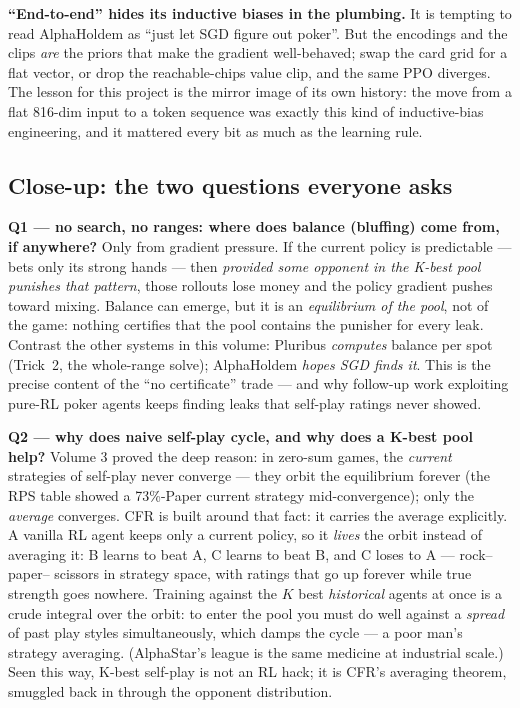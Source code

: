 \documentclass[11pt,a4paper]{article}
\begin{document}
\begin{trap}
\textbf{``End-to-end'' hides its inductive biases in the plumbing.} It is tempting
to read AlphaHoldem as ``just let SGD figure out poker''. But the encodings and
the clips \emph{are} the priors that make the gradient well-behaved; swap the card
grid for a flat vector, or drop the reachable-chips value clip, and the same PPO
diverges. The lesson for this project is the mirror image of its own history: the
move from a flat 816-dim input to a token sequence was exactly this kind of
inductive-bias engineering, and it mattered every bit as much as the learning
rule.
\end{trap}

\subsection{Close-up: the two questions everyone asks}

\textbf{Q1 --- no search, no ranges: where does balance (bluffing) come
from, if anywhere?} Only from gradient pressure. If the current policy is
predictable --- bets only its strong hands --- then \emph{provided some
opponent in the K-best pool punishes that pattern}, those rollouts lose
money and the policy gradient pushes toward mixing. Balance can emerge, but
it is an \emph{equilibrium of the pool}, not of the game: nothing certifies
that the pool contains the punisher for every leak. Contrast the other
systems in this volume: Pluribus \emph{computes} balance per spot (Trick~2,
the whole-range solve); AlphaHoldem \emph{hopes SGD finds it}. This is the
precise content of the ``no certificate'' trade --- and why follow-up work
exploiting pure-RL poker agents keeps finding leaks that self-play ratings
never showed.

\textbf{Q2 --- why does naive self-play cycle, and why does a K-best pool
help?} Volume 3 proved the deep reason: in zero-sum games, the
\emph{current} strategies of self-play never converge --- they orbit the
equilibrium forever (the RPS table showed a 73\%-Paper current strategy
mid-convergence); only the \emph{average} converges. CFR is built around
that fact: it carries the average explicitly. A vanilla RL agent keeps only
a current policy, so it \emph{lives} the orbit instead of averaging it:
B learns to beat A, C learns to beat B, and C loses to A --- rock--paper--%
scissors in strategy space, with ratings that go up forever while true
strength goes nowhere. Training against the $K$ best \emph{historical}
agents at once is a crude integral over the orbit: to enter the pool you
must do well against a \emph{spread} of past play styles simultaneously,
which damps the cycle --- a poor man's strategy averaging. (AlphaStar's
league is the same medicine at industrial scale.) Seen this way, K-best
self-play is not an RL hack; it is CFR's averaging theorem, smuggled back in
through the opponent distribution.
\end{document}
